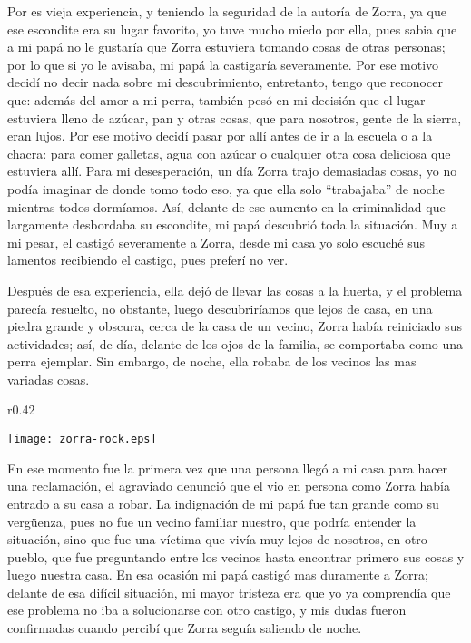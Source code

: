 Por es vieja experiencia, y teniendo la seguridad de la autoría de Zorra, ya que ese escondite era su lugar favorito, yo tuve mucho miedo por ella, pues sabia que a mi papá no le gustaría que Zorra estuviera tomando cosas de otras personas; por lo que si yo le avisaba, mi papá la castigaría severamente. Por ese motivo decidí no decir nada sobre mi descubrimiento, entretanto, tengo que reconocer que: además del amor a mi perra, también pesó en mi decisión que el lugar estuviera lleno de azúcar, pan y otras cosas, que para nosotros, gente de la sierra, eran lujos.
Por ese motivo decidí pasar por allí antes de ir a la escuela o a la chacra: para comer galletas, agua con azúcar o cualquier otra cosa deliciosa que estuviera allí.
Para mi desesperación, un día Zorra trajo demasiadas cosas, yo no podía imaginar de donde tomo todo eso, ya que ella solo ``trabajaba'' de noche mientras todos dormíamos. Así, delante de ese aumento en la criminalidad que largamente desbordaba su escondite, mi papá descubrió toda la situación.
Muy a mi pesar, el castigó severamente a Zorra, desde mi casa yo solo escuché sus lamentos recibiendo el castigo, pues preferí no ver.


Después de esa experiencia, ella dejó de llevar las cosas a la huerta, y el problema parecía resuelto, no obstante, luego descubriríamos que lejos de casa, en una piedra grande y obscura, cerca de la casa de un vecino, 
Zorra había reiniciado sus actividades; así, de día, delante de los ojos de la familia, se comportaba como una perra ejemplar. Sin embargo, de noche, ella robaba de los vecinos las mas variadas cosas.

\ifdefined\EnableIncludeImages
\begin{wrapfigure}{r}{0.42\textwidth}
  \begin{center}
  \vspace{-10pt}
    \texttt{[image: zorra-rock.eps]}
  \end{center}
  \vspace{-20pt}
\end{wrapfigure}
\fi
En ese momento fue la primera vez que una persona llegó a mi casa para hacer una reclamación, el agraviado denunció que el vio en persona como Zorra había entrado a su casa a robar.
La indignación de mi papá fue tan grande como su vergüenza, pues no fue un vecino familiar nuestro, que podría entender la situación, sino que fue una víctima que vivía muy lejos de nosotros, en otro pueblo, que fue preguntando entre los vecinos hasta encontrar primero sus cosas y luego nuestra casa.
En esa ocasión mi papá castigó mas duramente a Zorra; delante de esa difícil situación, mi mayor tristeza era que yo ya comprendía que ese problema no iba a solucionarse con otro castigo, y mis dudas fueron confirmadas cuando percibí que Zorra seguía saliendo de noche.

